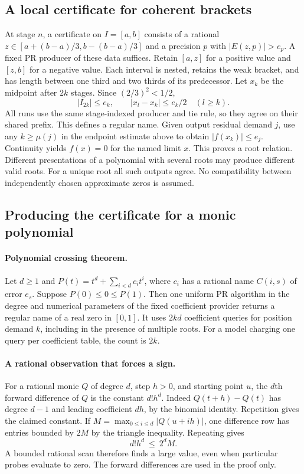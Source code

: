 \subsection{A local certificate for coherent brackets}

At stage $n$, a certificate on $I=[a,b]$ consists of a rational
$z\in[a+(b-a)/3,b-(b-a)/3]$ and a precision $p$ with
$|E(z,p)|>e_p$. A fixed PR producer of these data suffices. Retain
$[a,z]$ for a positive value and $[z,b]$ for a negative value.
Each interval is nested, retains the weak bracket, and has length
between one third and two thirds of its predecessor. Let $x_k$ be
the midpoint after $2k$ stages. Since $(2/3)^2<1/2$,
\[
    |I_{2k}|\le e_k,\qquad
    |x_l-x_k|\le e_k/2\quad(l\ge k).
\]
All runs use the same stage-indexed producer and tie rule, so they agree
on their shared prefix. This defines a regular name. Given output
residual demand $j$, use any $k\ge\mu(j)$ in the endpoint estimate
above to obtain $|f(x_k)|\le e_j$. Continuity yields $f(x)=0$ for
the named limit $x$. This proves a root relation. Different presentations
of a polynomial with several roots may produce different valid roots.
For a unique root all such outputs agree. No compatibility between
independently chosen approximate zeros is assumed.

\subsection{Producing the certificate for a monic polynomial}

\paragraph{Polynomial crossing theorem.}
Let $d\ge1$ and
$P(t)=t^d+\sum_{i<d}c_it^i$, where $c_i$ has a rational name $C(i,s)$
of error $e_s$. Suppose $P(0)\le0\le P(1)$. Then one uniform
PR algorithm in the degree and numerical parameters of the fixed
coefficient provider returns a regular name of a real zero in $[0,1]$.
It uses $2kd$ coefficient queries for position demand $k$, including
in the presence of multiple roots. For a model charging one query per
coefficient table, the count is $2k$.

\paragraph{A rational observation that forces a sign.}
For a rational monic $Q$ of degree $d$, step $h>0$, and starting point
$u$, the $d$th forward difference of $Q$ is the constant $d!h^d$.
Indeed $Q(t+h)-Q(t)$ has degree $d-1$ and leading coefficient $dh$,
by the binomial identity. Repetition gives the claimed constant.
If $M=\max_{0\le i\le d}|Q(u+ih)|$, one difference row has entries
bounded by $2M$ by the triangle inequality. Repeating gives
\[
  d!h^d\ \le\ 2^d M.                                      \tag{R1}
\]
A bounded rational scan therefore finds a large value, even when
particular probes evaluate to zero. The forward differences are used
in the proof only.

